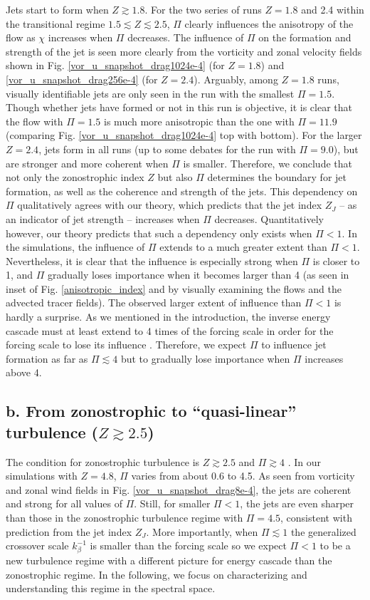 \documentclass{ametsoc}
\begin{document}
Jets start to form when $Z\apprge1.8$. For the two series of runs
$Z=1.8$ and 2.4 within the transitional regime $1.5\apprle Z\apprle2.5$,
$\Pi$ clearly influences the anisotropy of the flow as $\chi$ increases
when $\Pi$ decreases. The influence of $\Pi$ on the formation and
strength of the jet is seen more clearly from the vorticity and zonal
velocity fields shown in Fig. \ref{vor_u_snapshot_drag1024e-4} (for
$Z=1.8$) and \ref{vor_u_snapshot_drag256e-4} (for $Z=2.4$). Arguably,
among $Z=1.8$ runs, visually identifiable jets are only seen in the
run with the smallest $\Pi=1.5$. Though whether jets have formed
or not in this run is objective, it is clear that the flow with $\Pi=1.5$
is much more anisotropic than the one with $\Pi=11.9$ (comparing
Fig. \ref{vor_u_snapshot_drag1024e-4} top with bottom). For the larger
$Z=2.4$, jets form in all runs (up to some debates for the run with
$\Pi=9.0$), but are stronger and more coherent when $\Pi$ is
smaller. Therefore, we conclude that not only the zonostrophic index
$Z$ but also $\Pi$ determines the boundary for jet formation, as
well as the coherence and strength of the jets. This dependency on
$\Pi$ qualitatively agrees with our theory, which predicts that the
jet index $Z_{J}$ -- as an indicator of jet strength -- increases
when $\Pi$ decreases. Quantitatively however, our theory predicts that
such a dependency only exists when $\Pi<1$. In the simulations, the
influence of $\Pi$ extends to a much greater extent than $\Pi<1$.
Nevertheless, it is clear that the influence is especially strong
when $\Pi$ is closer to 1, and $\Pi$ gradually loses importance
when it becomes larger than 4 (as seen in inset of Fig. \ref{anisotropic_index}
and by visually examining the flows and the advected tracer fields).
The observed larger extent of influence than $\Pi<1$ is hardly a
surprise. As we mentioned in the introduction, the inverse energy cascade
must at least extend to 4 times of the forcing scale in order for
the forcing scale to lose its influence \citep{Chen2006}. Therefore,
we expect $\Pi$ to influence jet formation as far as $\Pi\apprle4$
but to gradually lose importance when $\Pi$ increases above 4.


\subsection*{b. From zonostrophic to ``quasi-linear'' turbulence ($Z\apprge2.5$)}

The condition for zonostrophic turbulence is $Z\apprge2.5$ and $\Pi\apprge4$
\citep{Sukoriansky2007,Galperin2010}. In our simulations with $Z=4.8$,
$\Pi$ varies from about 0.6 to 4.5. As seen from vorticity and zonal
wind fields in Fig. \ref{vor_u_snapshot_drag8e-4}, the jets are coherent
and strong for all values of $\Pi$. Still, for smaller $\Pi<1$,
the jets are even sharper than those in the zonostrophic turbulence
regime with $\Pi=4.5$, consistent with prediction from the jet index
$Z_{J}$. More importantly, when $\Pi\apprle1$ the generalized crossover
scale $k_{\beta}^{-1}$ is smaller than the forcing scale so we expect
$\Pi<1$ to be a new turbulence regime with a different picture for
energy cascade than the zonostrophic regime. In the following, we
focus on characterizing and understanding this regime in the spectral
space.
\end{document}
